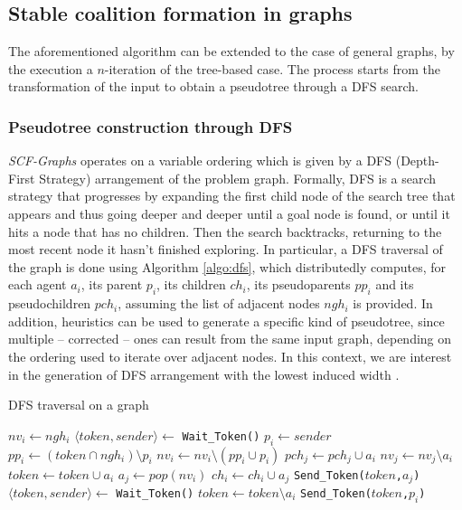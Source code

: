 \documentclass[11pt, twoside, titlepage, a4paper, openright]{report}
\begin{document}
\subsection{Stable coalition formation in graphs}

The aforementioned algorithm can be extended to the case of general graphs, by the execution a $n$-iteration of the tree-based case. The process starts from the transformation of the input to obtain a pseudotree through a DFS search.

\subsubsection{Pseudotree construction through DFS}

\textit{SCF-Graphs} operates on a variable ordering which is given by a DFS (Depth-First Strategy) arrangement of the problem graph. Formally, DFS is a search strategy that progresses by expanding the first child node of the search tree that appears and thus going deeper and deeper until a goal node is found, or until it hits a node that has no children. Then the search backtracks, returning to the most recent node it hasn't finished exploring. In particular, a DFS traversal of the graph is done using Algorithm \ref{algo:dfs}, which distributedly computes, for each agent $a_i$, its parent $p_i$, its children $ch_i$, its pseudoparents $pp_i$ and its pseudochildren $pch_i$, assuming the list of adjacent nodes $ngh_i$ is provided. In addition, heuristics can be used to generate a specific kind of pseudotree, since multiple -- corrected -- ones can result from the same input graph, depending on the ordering used to iterate over adjacent nodes. In this context, we are interest in the generation of DFS arrangement with the lowest induced width \cite{DBLP:conf/cp/2006}. 

\begin{algorithm}[!h]\caption{DFS traversal on a graph}\label{algo:dfs}
\begin{algorithmic}
\State $nv_i\gets ngh_i$
\State $\langle token,sender\rangle\gets$ \texttt{Wait\_Token()}
\State $p_i \gets sender$
\State $pp_i \gets (token \cap ngh_i)\setminus p_i$
\State $nv_i \gets nv_i \setminus (pp_i \cup p_i)$
\State $pch_j \gets pch_j \cup a_i$
\State $nv_j \gets nv_j \setminus a_i$
\EndFor
\EndIf
\State $token\gets token \cup a_i$
\State $a_j \gets pop(nv_i)$
\State $ch_i \gets ch_i \cup a_j$
\State \texttt{Send\_Token(}$token$\texttt{,}$a_j$\texttt{)}
\State $\langle token,sender\rangle\gets$ \texttt{Wait\_Token()}
\EndWhile
\State $token\gets token \setminus a_i$
\State \texttt{Send\_Token(}$token$\texttt{,}$p_i$\texttt{)}
\EndIf
\end{algorithmic}
\end{algorithm}
\end{document}
